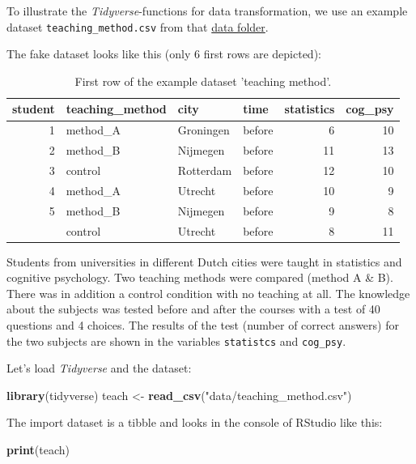 \documentclass[
]{scrartcl}
\newenvironment{Shaded}{\begin{snugshade}}{\end{snugshade}}
\newcommand{\FunctionTok}[1]{\textcolor[rgb]{0.13,0.29,0.53}{\textbf{#1}}}
\newcommand{\NormalTok}[1]{#1}
\newcommand{\OtherTok}[1]{\textcolor[rgb]{0.56,0.35,0.01}{#1}}
\newcommand{\StringTok}[1]{\textcolor[rgb]{0.31,0.60,0.02}{#1}}
\begin{document}
To illustrate the \emph{Tidyverse}-functions for data transformation, we use an example dataset \texttt{teaching\_method.csv} from that \href{./data}{data folder}.

The fake dataset looks like this (only 6 first rows are depicted):

\begin{table}

\caption{\label{tab:unnamed-chunk-148}First row of the example dataset 'teaching method'.}
\centering
\begin{tabular}[t]{rlllrr}
\toprule
student & teaching\_method & city & time & statistics & cog\_psy\\
\midrule
1 & method\_A & Groningen & before & 6 & 10\\
2 & method\_B & Nijmegen & before & 11 & 13\\
3 & control & Rotterdam & before & 12 & 10\\
4 & method\_A & Utrecht & before & 10 & 9\\
5 & method\_B & Nijmegen & before & 9 & 8\\
\addlinespace
6 & control & Utrecht & before & 8 & 11\\
\bottomrule
\end{tabular}
\end{table}

Students from universities in different Dutch cities were taught in statistics and cognitive psychology. Two teaching methods were compared (method A \& B). There was in addition a control condition with no teaching at all. The knowledge about the subjects was tested before and after the courses with a test of 40 questions and 4 choices. The results of the test (number of correct answers) for the two subjects are shown in the variables \texttt{statistcs} and \texttt{cog\_psy}.

Let's load \emph{Tidyverse} and the dataset:

\begin{Shaded}
\begin{Highlighting}[]
\FunctionTok{library}\NormalTok{(tidyverse)}
\NormalTok{teach }\OtherTok{\textless{}{-}} \FunctionTok{read\_csv}\NormalTok{(}\StringTok{"data/teaching\_method.csv"}\NormalTok{)}
\end{Highlighting}
\end{Shaded}

The import dataset is a tibble and looks in the console of RStudio like this:

\begin{Shaded}
\begin{Highlighting}[]
\FunctionTok{print}\NormalTok{(teach)}
\end{Highlighting}
\end{Shaded}
\end{document}
